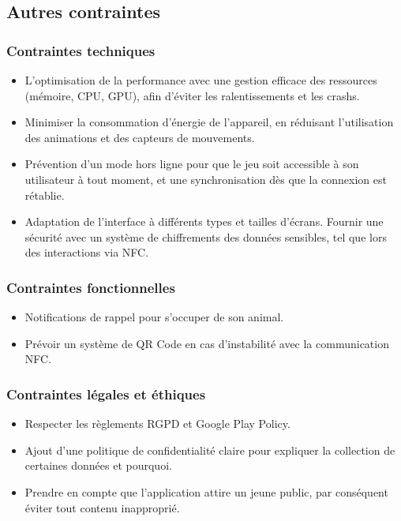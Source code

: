 \documentclass{rapportECL}
\begin{document}
\subsection{Autres contraintes}
\subsubsection{Contraintes techniques}
\begin{itemize}[label=\textbullet]
\item L’optimisation de la performance avec une gestion efficace des ressources (mémoire, CPU, GPU), afin d’éviter les ralentissements et les crashs.
\item Minimiser la consommation d'énergie de l’appareil, en réduisant l’utilisation des animations et des capteurs de mouvements.
\item Prévention d’un mode hors ligne pour que le jeu soit accessible à son utilisateur à tout moment, et une synchronisation dès que la connexion est rétablie.
\item Adaptation de l’interface à différents types et tailles d’écrans.
Fournir une sécurité avec un système de chiffrements des données sensibles, tel que lors des interactions via NFC.
\end{itemize}
\subsubsection{Contraintes fonctionnelles}
\begin{itemize}[label=\textbullet]
\item Notifications de rappel pour s’occuper de son animal.
\item Prévoir un système de QR Code en cas d’instabilité avec la communication NFC.
\end{itemize}
\subsubsection{Contraintes légales et éthiques}
\begin{itemize}[label=\textbullet]
\item Respecter les règlements RGPD et Google Play Policy.
\item Ajout d’une politique de confidentialité claire pour expliquer la collection de certaines données et pourquoi.
\item Prendre en compte que l’application attire un jeune public, par conséquent éviter tout contenu inapproprié.
\end{itemize}
\end{document}
